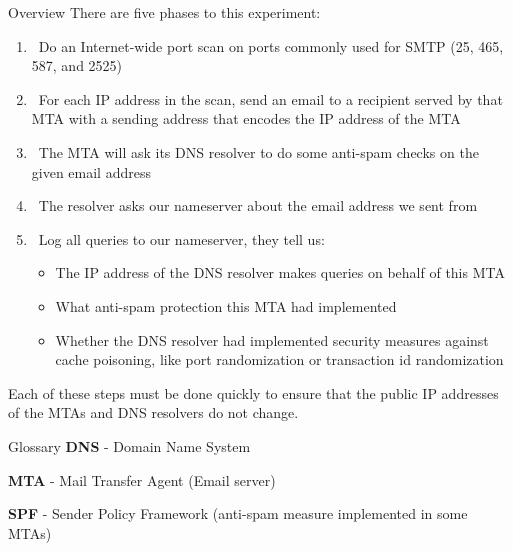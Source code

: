 \documentclass[final]{beamer}
\newlength{\onecolwid}
\newlength{\twocolwid}
\begin{document}
\begin{frame}[t]
\begin{columns}[t]
\begin{column}{\twocolwid}
\begin{columns}[t,totalwidth=\twocolwid]
\begin{column}{\onecolwid}
\begin{block}{Overview}
There are five phases to this experiment: %
\begin{enumerate}
\item ~Do an Internet-wide port scan on ports commonly used for SMTP (25, 465, 587, and 2525)
\item ~For each IP address in the scan, send an email to a recipient served by that MTA with a sending address that encodes the IP address of the MTA
\item ~The MTA will ask its DNS resolver to do some anti-spam checks on the given email address
\item ~The resolver asks our nameserver about the email address we sent from
\item ~Log all queries to our nameserver, they tell us:
\vspace{0.3cm}
\begin{itemize}
\item The IP address of the DNS resolver makes queries on behalf of this MTA
\vspace{0.2cm}
\item What anti-spam protection this MTA had implemented
\vspace{0.2cm}
\item Whether the DNS resolver had implemented security measures against cache poisoning, like port randomization or transaction id randomization
\end{itemize}
\end{enumerate}
Each of these steps must be done quickly to ensure that the public IP addresses of the MTAs and DNS resolvers do not change.

\end{block}


\begin{block}{Glossary}
\textbf{DNS} - Domain Name System

\textbf{MTA} - Mail Transfer Agent (Email server)

\textbf{SPF} - Sender Policy Framework (anti-spam measure implemented in some MTAs)
\end{block}



\end{column} %


\end{columns}
\end{column}
\end{columns}
\end{frame}
\end{document}
